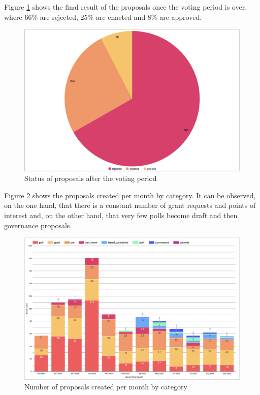 \documentclass[MSE,Master,english]{twbook}%
\begin{document}
Figure \ref{fig:proposal_status} shows the final result of the proposals once the voting period is over, where 66\% are rejected, 25\% are enacted and 8\% are approved.
\begin{figure}[H]
  \centering
  \includegraphics[width=\textwidth]{metrics/proposal_status.png}
  \caption{Status of proposals after the voting period}
  \label{fig:proposal_status}
\end{figure}

Figure \ref{fig:proposals_by_month} shows the proposals created per month by category. It can be observed, on the one hand, that there is a constant number of grant requests and points of interest and, on the other hand, that very few polls become draft and then governance proposals.
\begin{figure}[H]
  \centering
  \includegraphics[width=\textwidth]{metrics/proposals_by_month.png}
  \caption{Number of proposals created per month by category}
  \label{fig:proposals_by_month}
\end{figure}
\end{document}

